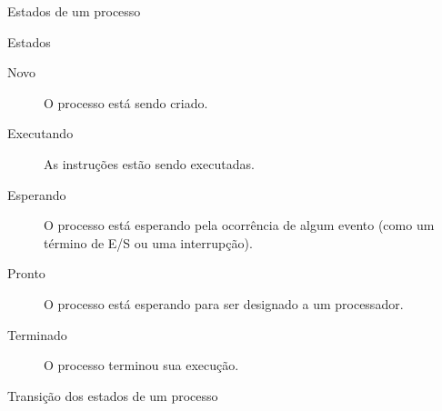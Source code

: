 \begin{frame}{Estados de um processo}
  
\begin{block}{Estados}
  \begin{description}
  \item[Novo] O processo está sendo criado.
  \item[Executando] As instruções estão sendo executadas.
  \item[Esperando] O processo está esperando pela ocorrência de algum
    evento (como um término de E/S ou uma interrupção).
  \item[Pronto] O processo está esperando para ser designado a um processador.
  \item[Terminado] O processo terminou sua execução.
  \end{description}
\end{block}

\end{frame}

\begin{frame}[fragile]{Transição dos estados de um processo}
  
	

\end{frame}

